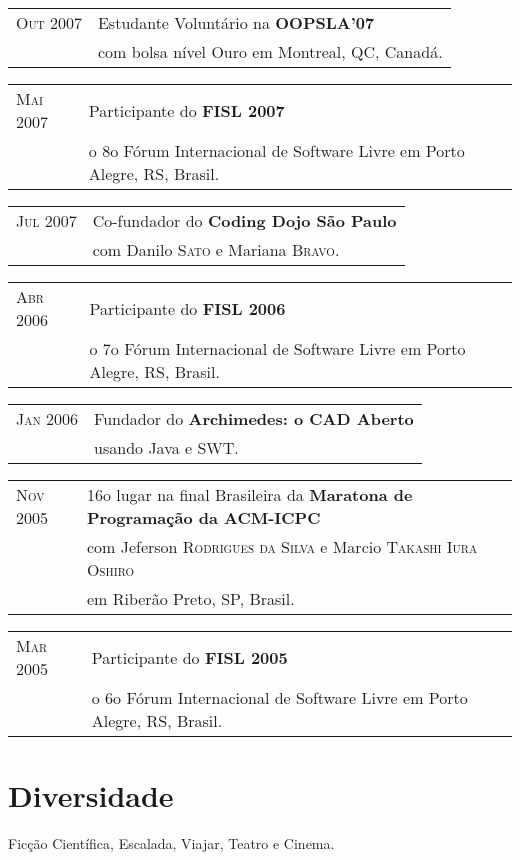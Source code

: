 \documentclass[letter,10pt]{article}
\begin{document}
\begin{tabular}{p{2.5cm}l}
  \textsc{Out 2007} & Estudante Voluntário na \textbf{OOPSLA'07}\\
  & com bolsa nível Ouro em Montreal, QC, Canadá.\\
\end{tabular}

\begin{tabular}{p{2.5cm}l}
  \textsc{Mai 2007} & Participante do \textbf{FISL 2007}\\
  & o 8o Fórum Internacional de Software Livre em Porto
  Alegre, RS, Brasil.\\
\end{tabular}

\begin{tabular}{p{2.5cm}l}
  \textsc{Jul 2007} & Co-fundador do \textbf{Coding Dojo São Paulo}\\
  & com Danilo \textsc{Sato} e Mariana \textsc{Bravo}.\\
\end{tabular}

\begin{tabular}{p{2.5cm}l}
  \textsc{Abr 2006} & Participante do \textbf{FISL 2006}\\
  & o 7o Fórum Internacional de Software Livre em Porto
  Alegre, RS, Brasil.\\
\end{tabular}

\begin{tabular}{p{2.5cm}l}
  \textsc{Jan 2006} & Fundador do \textbf{Archimedes: o CAD Aberto}\\
  & usando Java e SWT.\\
\end{tabular}

\begin{tabular}{p{2.5cm}l}
  \textsc{Nov 2005} & 16o lugar na final Brasileira da
  \textbf{Maratona de Programação da ACM-ICPC}\\
  & com Jeferson \textsc{Rodrigues da Silva} e Marcio
  \textsc{Takashi Iura Oshiro}\\
  & em Riberão Preto, SP, Brasil.\\
\end{tabular}

\begin{tabular}{p{2.5cm}l}
  \textsc{Mar 2005} & Participante do \textbf{FISL 2005}\\
  & o 6o Fórum Internacional de Software Livre em Porto
  Alegre, RS, Brasil.\\
\end{tabular}

\section{Diversidade}

Ficção Científica, Escalada, Viajar, Teatro e Cinema.
\end{document}
